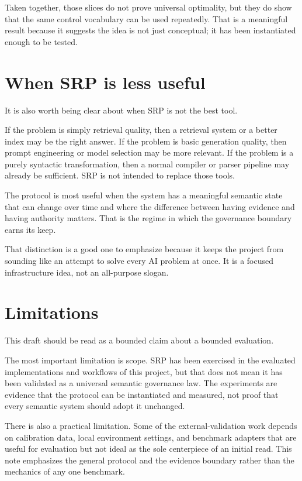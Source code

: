 \documentclass[10pt]{article}
\begin{document}
Taken together, those slices do not prove universal optimality, but they do show that the same control vocabulary can be used repeatedly. That is a meaningful result because it suggests the idea is not just conceptual; it has been instantiated enough to be tested.

\section{When SRP is less useful}
It is also worth being clear about when SRP is not the best tool.

If the problem is simply retrieval quality, then a retrieval system or a better index may be the right answer. If the problem is basic generation quality, then prompt engineering or model selection may be more relevant. If the problem is a purely syntactic transformation, then a normal compiler or parser pipeline may already be sufficient. SRP is not intended to replace those tools.

The protocol is most useful when the system has a meaningful semantic state that can change over time and where the difference between having evidence and having authority matters. That is the regime in which the governance boundary earns its keep.

That distinction is a good one to emphasize because it keeps the project from sounding like an attempt to solve every AI problem at once. It is a focused infrastructure idea, not an all-purpose slogan.

\section{Limitations}
This draft should be read as a bounded claim about a bounded evaluation.

The most important limitation is scope. SRP has been exercised in the evaluated implementations and workflows of this project, but that does not mean it has been validated as a universal semantic governance law. The experiments are evidence that the protocol can be instantiated and measured, not proof that every semantic system should adopt it unchanged.

There is also a practical limitation. Some of the external-validation work depends on calibration data, local environment settings, and benchmark adapters that are useful for evaluation but not ideal as the sole centerpiece of an initial read. This note emphasizes the general protocol and the evidence boundary rather than the mechanics of any one benchmark.
\end{document}
